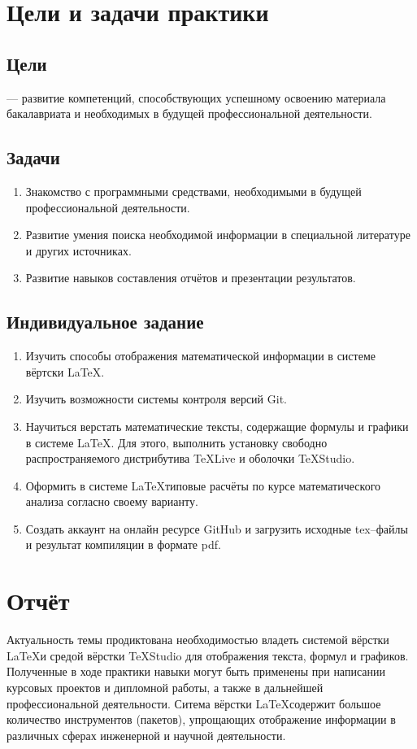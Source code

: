\documentclass[12pt]{article}
\begin{document}
\section{Цели и задачи практики}	
\subsection{Цели}
--- развитие компетенций, способствующих успешному освоению материала бакалавриата и необходимых в будущей профессиональной деятельности.
\subsection{Задачи}
\begin{enumerate}
	\item Знакомство с программными средствами, необходимыми в будущей профессиональной деятельности.
	\item Развитие умения поиска необходимой информации в специальной литературе и других источниках.
	\item Развитие навыков составления отчётов и презентации результатов.
\end{enumerate}
\subsection{Индивидуальное задание}	
\begin{enumerate}
	\item Изучить способы отображения математической информации в системе вёртски \LaTeX.
	\item Изучить возможности  системы контроля версий \textsf{Git}.
	\item Научиться верстать математические тексты, содержащие формулы и графики в системе \LaTeX.
	Для этого, выполнить установку свободно распространяемого дистрибутива \textsf{TeXLive} и оболочки \textsf{TeXStudio}.
	\item Оформить в системе \LaTeX типовые расчёты по курсе математического анализа согласно своему варианту.
	\item Создать аккаунт на онлайн ресурсе \textsf{GitHub} и загрузить исходные \textsf{tex}--файлы 
	и результат компиляции в формате \textsf{pdf}.
\end{enumerate} 
\newpage
\section{Отчёт}
Актуальность темы продиктована необходимостью владеть системой вёрстки \LaTeX и средой вёрстки \textsf{TeXStudio} для
отображения текста, формул и графиков. Полученные в ходе практики навыки могут быть применены при написании
курсовых проектов и дипломной работы, а также в дальнейшей профессиональной деятельности.
Ситема вёрстки \LaTeX содержит большое количество инструментов (пакетов), упрощающих отображение информации в различных 
сферах инженерной и научной деятельности. 
\newpage
\end{document}

